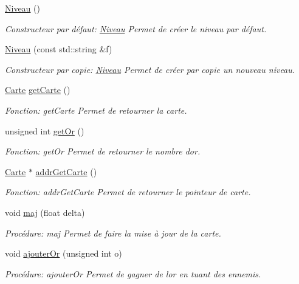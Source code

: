 \begin{DoxyCompactItemize}
\item 
\hyperlink{classNiveau_abf99be59a575d462a25c4ade5c124431}{Niveau} ()
\begin{DoxyCompactList}\small\item\em Constructeur par défaut\+: \hyperlink{classNiveau}{Niveau} Permet de créer le niveau par défaut. \end{DoxyCompactList}\item 
\hyperlink{classNiveau_a5f59a46da066f15b0c21154cbf583490}{Niveau} (const std\+::string \&f)
\begin{DoxyCompactList}\small\item\em Constructeur par copie\+: \hyperlink{classNiveau}{Niveau} Permet de créer par copie un nouveau niveau. \end{DoxyCompactList}\item 
\hyperlink{classCarte}{Carte} \hyperlink{classNiveau_a503e0b7db795e1f9bf3ea76cc4fd9e99}{get\+Carte} ()
\begin{DoxyCompactList}\small\item\em Fonction\+: get\+Carte Permet de retourner la carte. \end{DoxyCompactList}\item 
unsigned int \hyperlink{classNiveau_a86202965dadd70b9f13c4e5e78a46542}{get\+Or} ()
\begin{DoxyCompactList}\small\item\em Fonction\+: get\+Or Permet de retourner le nombre d\textquotesingle{}or. \end{DoxyCompactList}\item 
\hyperlink{classCarte}{Carte} $\ast$ \hyperlink{classNiveau_a47ea8b8f36e27be8ad0d3f534a956260}{addr\+Get\+Carte} ()
\begin{DoxyCompactList}\small\item\em Fonction\+: addr\+Get\+Carte Permet de retourner le pointeur de carte. \end{DoxyCompactList}\item 
void \hyperlink{classNiveau_a4434c142b17c0299d2d7744b2ea11e99}{maj} (float delta)
\begin{DoxyCompactList}\small\item\em Procédure\+: maj Permet de faire la mise à jour de la carte. \end{DoxyCompactList}\item 
void \hyperlink{classNiveau_aca63b4ff95491069ebf5a8931ffc6d03}{ajouter\+Or} (unsigned int o)
\begin{DoxyCompactList}\small\item\em Procédure\+: ajouter\+Or Permet de gagner de l\textquotesingle{}or en tuant des ennemis. \end{DoxyCompactList}\item 

\end{DoxyCompactItemize}
